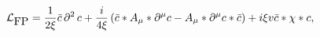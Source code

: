 \begin{equation}
{\cal L}_{\mbox{FP}} = \frac{1}{2 \xi} \bar{c} \,\partial^2 \, c +
\frac{i}{4 \xi} \left(\bar{c} \ast A_{\mu} \ast \partial^{\mu} c -
A_{\mu} \ast \partial ^{\mu} c \ast \bar{c} \right) +i\xi v \bar{c}*\chi*c,
\end{equation}

